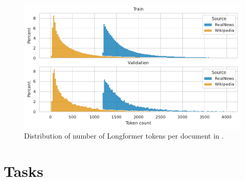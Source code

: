 \begin{figure}
    \includegraphics[width=\textwidth]{./img/train_data_dist.pdf}

    \caption{Distribution of number of Longformer tokens per document in
    .}

    \label{fig:train_data_ecdf}
\end{figure}









\section{Tasks}

